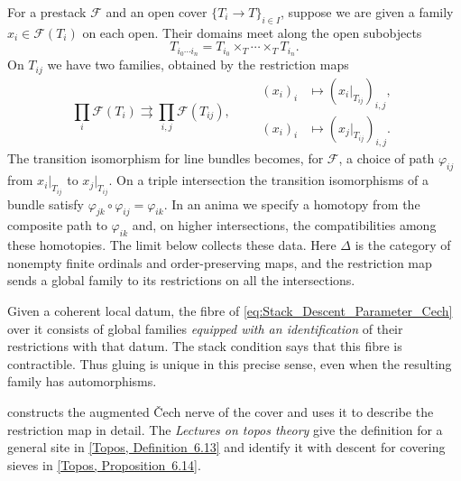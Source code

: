 For a prestack $\mathcal F$ and an open cover $\{T_i\to T\}_{i\in I}$,
suppose we are given a family $x_i\in\mathcal F(T_i)$ on each open.
Their domains meet along the open subobjects
\[
 T_{i_0\cdots i_n}=T_{i_0}\times_T\cdots\times_T T_{i_n}.
\]
On $T_{ij}$ we have two families, obtained by the restriction maps
\[
 \prod_i\mathcal F(T_i)\rightrightarrows\prod_{i,j}\mathcal F(T_{ij}),
 \qquad
 \begin{aligned}
   (x_i)_i &\longmapsto (x_i|_{T_{ij}})_{i,j},\\
   (x_i)_i &\longmapsto (x_j|_{T_{ij}})_{i,j}.
 \end{aligned}
\]
The transition isomorphism for line bundles becomes, for $\mathcal F$,
a choice of path $\varphi_{ij}$ from $x_i|_{T_{ij}}$ to $x_j|_{T_{ij}}$.
On a triple intersection the transition isomorphisms of a bundle satisfy
$\varphi_{jk}\circ\varphi_{ij}=\varphi_{ik}$. In an anima we specify
a homotopy from the composite path to $\varphi_{ik}$ and, on higher
intersections, the compatibilities among these homotopies. The limit
below collects these data. Here $\Delta$ is the category of nonempty
finite ordinals and order-preserving maps, and the restriction map
sends a global family to its restrictions on all the intersections.


Given a coherent local datum, the fibre of
\eqref{eq:Stack_Descent_Parameter_Cech} over it consists of global
families \emph{equipped with an identification} of their restrictions
with that datum. The stack condition says that this fibre is contractible.
Thus gluing is unique in this precise sense, even when the resulting
family has automorphisms.

 constructs the augmented \v{C}ech
nerve of the cover and uses it to describe the restriction map in detail.
The \emph{Lectures on topos theory}\nocite{Hoyois_Cnossen_Lectures_Topos}
give the definition for a general site in
\href{https://animarium.org/tag/028P/}{[Topos, Definition~6.13]} and
identify it with descent for covering sieves in
\href{https://animarium.org/tag/028Q/}{[Topos, Proposition~6.14]}.

